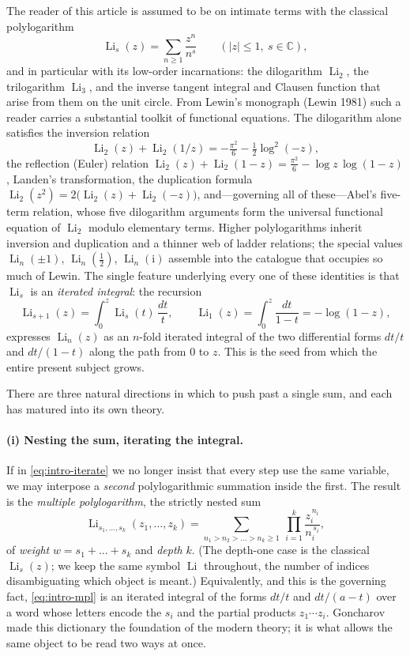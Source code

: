\documentclass[11pt]{article}
\DeclareMathOperator{\Li}{Li}
\newcommand{\iu}{\mathrm{i}}
\theoremstyle{plain}
\theoremstyle{remark}
\begin{document}
The reader of this article is assumed to be on intimate terms with the classical
polylogarithm
\[
  \Li_s(z)=\sum_{n\ge1}\frac{z^n}{n^s}\qquad(|z|\le1,\ s\in\mathbb{C}),
\]
and in particular with its low-order incarnations: the dilogarithm $\Li_2$, the
trilogarithm $\Li_3$, and the inverse tangent integral and Clausen function that
arise from them on the unit circle. From Lewin's monograph (Lewin 1981) such a
reader carries a substantial toolkit of functional equations. The dilogarithm
alone satisfies the inversion relation
\[
  \Li_2(z)+\Li_2(1/z)=-\tfrac{\pi^2}{6}-\tfrac12\log^2(-z),
\]
the reflection (Euler) relation $\Li_2(z)+\Li_2(1-z)=\tfrac{\pi^2}{6}-\log z\,\log(1-z)$,
Landen's transformation, the duplication formula
$\Li_2(z^2)=2\bigl(\Li_2(z)+\Li_2(-z)\bigr)$, and—governing all of these—Abel's
five-term relation, whose five dilogarithm arguments form the universal functional
equation of $\Li_2$ modulo elementary terms. Higher polylogarithms inherit
inversion and duplication and a thinner web of ladder relations; the special
values $\Li_n(\pm1)$, $\Li_n(\tfrac12)$, $\Li_n(\iu)$ assemble into the catalogue
that occupies so much of Lewin. The single feature underlying every one of these
identities is that $\Li_s$ is an \emph{iterated integral}: the recursion
\begin{equation}\label{eq:intro-iterate}
  \Li_{s+1}(z)=\int_0^z \Li_s(t)\,\frac{dt}{t},\qquad
  \Li_1(z)=\int_0^z\frac{dt}{1-t}=-\log(1-z),
\end{equation}
expresses $\Li_n(z)$ as an $n$-fold iterated integral of the two differential
forms $dt/t$ and $dt/(1-t)$ along the path from $0$ to $z$. This is the seed from
which the entire present subject grows.

\medskip
There are three natural directions in which to push past a single sum, and each
has matured into its own theory.

\paragraph{(i) Nesting the sum, iterating the integral.}
If in \eqref{eq:intro-iterate} we no longer insist that every step use the same
variable, we may interpose a \emph{second} polylogarithmic summation inside the
first. The result is the \emph{multiple polylogarithm}, the strictly nested sum
\begin{equation}\label{eq:intro-mpl}
  \Li_{s_1,\dots,s_k}(z_1,\dots,z_k)
  =\sum_{n_1>n_2>\dots>n_k\ge1}\ \prod_{i=1}^{k}\frac{z_i^{\,n_i}}{n_i^{\,s_i}},
\end{equation}
of \emph{weight} $w=s_1+\dots+s_k$ and \emph{depth} $k$. (The depth-one case is
the classical $\Li_s(z)$; we keep the same symbol $\Li$ throughout, the number of
indices disambiguating which object is meant.) Equivalently, and this is the
governing fact, \eqref{eq:intro-mpl} is an iterated integral of the forms
$dt/t$ and $dt/(a-t)$ over a word whose letters encode the $s_i$ and the partial
products $z_1\cdots z_i$. Goncharov made this dictionary the foundation of the
modern theory; it is what allows the same object to be read two ways at once.
\end{document}

